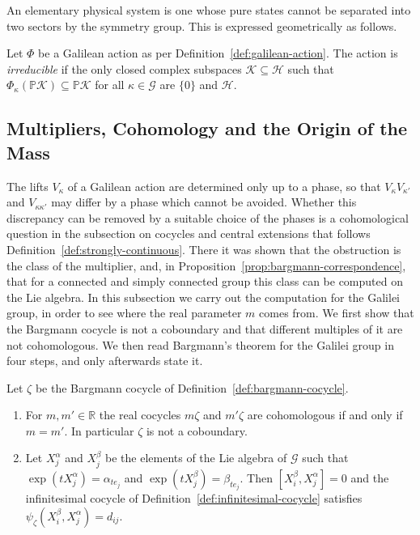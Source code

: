 An elementary physical system is one whose pure states cannot be separated into two sectors by the symmetry group. This is expressed geometrically as follows.

\begin{definition}\label{def:irreducible-action}
	Let $\Phi$ be a Galilean action as per Definition~\ref{def:galilean-action}. The action is \emph{irreducible} if the only closed complex subspaces $\mathcal{K}\subseteq\mathcal{H}$ such that $\Phi_\kappa(\mathbb{P}\mathcal{K})\subseteq\mathbb{P}\mathcal{K}$ for all $\kappa\in\mathcal{G}$ are $\{0\}$ and $\mathcal{H}$.
\end{definition}

\subsection*{Multipliers, Cohomology and the Origin of the Mass}

The lifts $V_\kappa$ of a Galilean action are determined only up to a phase, so that $V_\kappa V_{\kappa'}$ and $V_{\kappa\kappa'}$ may differ by a phase which cannot be avoided. Whether this discrepancy can be removed by a suitable choice of the phases is a cohomological question in the subsection on cocycles and central extensions that follows Definition~\ref{def:strongly-continuous}. There it was shown that the obstruction is the class of the multiplier, and, in Proposition~\ref{prop:bargmann-correspondence}, that for a connected and simply connected group this class can be computed on the Lie algebra. In this subsection we carry out the computation for the Galilei group, in order to see where the real parameter $m$ comes from. We first show that the Bargmann cocycle is not a coboundary and that different multiples of it are not cohomologous. We then read Bargmann's theorem for the Galilei group in four steps, and only afterwards state it.

\begin{proposition}\label{prop:bargmann-nontrivial}
	Let $\zeta$ be the Bargmann cocycle of Definition~\ref{def:bargmann-cocycle}.
	\begin{enumerate}
		\item For $m,m'\in\mathbb{R}$ the real cocycles $m\zeta$ and $m'\zeta$ are cohomologous if and only if $m=m'$. In particular $\zeta$ is not a coboundary.
		\item Let $X^\alpha_j$ and $X^\beta_j$ be the elements of the Lie algebra of $\mathcal{G}$ such that $\exp(tX^\alpha_j)=\alpha_{te_j}$ and $\exp(tX^\beta_j)=\beta_{te_j}$. Then $[X^\beta_i,X^\alpha_j]=0$ and the infinitesimal cocycle of Definition~\ref{def:infinitesimal-cocycle} satisfies $\psi_\zeta(X^\beta_i,X^\alpha_j)=d_{ij}$.
	\end{enumerate}
\end{proposition}

